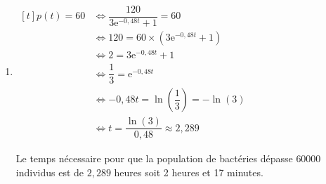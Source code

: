 \documentclass[10pt]{article}
\providecommand{\e}{{\mathrm{e}}}
\providecommand{\np}[2][]{{#2~#1}}
\begin{document}
\begin{enumerate}
et finalement par quotient, $\lim\limits_{t \to +\infty}p(t) =120$ 

Dans le contexte de l'exercice la population de la bactérie  se stabilisera vers $\np{120000}$. 



\item $\begin{aligned}[t] p(t)=60 & \iff \dfrac{120}{3 \e^{-0,48t} +1 }=60 \\
	& \iff 120 = 60 \times \left(3 \e^{-0,48t} +1\right)\\
	& \iff 2 = 3 \e^{-0,48t} +1\\
	& \iff \dfrac{1}{3}= \e^{-0,48t}\\
	& \iff -0,48 t = \ln\left(\dfrac{1}{3}\right)=-\ln(3)\\
	& \iff t = \dfrac{\ln(3)}{0,48}\approx 2,289
	\end{aligned}$
	
Le temps nécessaire pour que la population de bactéries dépasse $\np{60000}$ individus est de $2,289$ heures soit 2 heures et 17 minutes.
\end{enumerate}
\end{document}
